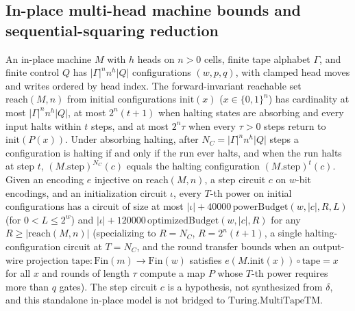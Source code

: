 \begin{result}
\subsection{In-place multi-head machine bounds and sequential-squaring reduction}
An in-place machine $M$ with $h$ heads on $n>0$ cells, finite tape alphabet $\Gamma$, and finite
control $Q$ has $|\Gamma|^n n^h |Q|$ configurations $(w,p,q)$, with clamped head moves and writes
ordered by head index. The forward-invariant reachable set $\mathrm{reach}(M,n)$ from initial
configurations $\mathrm{init}(x)$ ($x\in\{0,1\}^n$) has cardinality at most $|\Gamma|^n n^h |Q|$, at
most $2^n(t+1)$ when halting states are absorbing and every input halts within $t$ steps, and at
most $2^n\tau$ when every $\tau>0$ steps return to $\mathrm{init}(P(x))$. Under absorbing halting,
after $N_C=|\Gamma|^n n^h |Q|$ steps a configuration is halting if and only if the run ever halts,
and when the run halts at step $t$, $(M.\mathrm{step})^{N_C}(c)$ equals the halting configuration
$(M.\mathrm{step})^t(c)$. Given an encoding $e$ injective on $\mathrm{reach}(M,n)$, a
step circuit $c$ on $w$-bit encodings, and an initialization circuit $\iota$, every $T$-th power on
initial configurations has a circuit of size at most $|\iota|+40000\,\mathrm{powerBudget}(w,|c|,R,L)$
(for $0<L\le 2^w$) and $|\iota|+120000\,\mathrm{optimizedBudget}(w,|c|,R)$ for any $R\ge|\mathrm{reach}(M,n)|$
(specializing to $R=N_C$, $R=2^n(t+1)$, a single halting-configuration circuit at $T=N_C$, and the
round transfer bounds when an output-wire projection $\mathrm{tape}:\mathrm{Fin}(m)\to\mathrm{Fin}(w)$
satisfies $e(M.\mathrm{init}(x))\circ\mathrm{tape}=x$ for all $x$ and rounds of length $\tau$ compute
a map $P$ whose $T$-th power requires more than $q$ gates). The step circuit $c$ is a hypothesis, not
synthesized from $\delta$, and this standalone in-place model is not bridged to
$\mathrm{Turing.MultiTapeTM}$.


\end{result}

